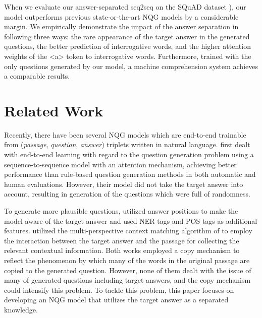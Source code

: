 \documentclass[letterpaper]{article} %
\newcommand{\kj}[1]{\textcolor{red}{#1}}
\begin{document}
When we evaluate our answer-separated seq2seq on the SQuAD dataset \cite{rajpurkar2016squad}), our model outperforms previous state-or-the-art NQG models by a considerable margin. We empirically demonstrate the impact of the answer separation in following three ways: the rare appearance of the target answer in the generated questions, the better prediction of interrogative words, and the higher attention weights of the \textless a\textgreater{} token to interrogative words. Furthermore, trained with the only questions generated by our model, a machine comprehension system achieves a comparable results.
%
%
%
%



\section{Related Work}
Recently, there have been several NQG models which are end-to-end trainable from (\textit{passage}, \textit{question}, \textit{answer}) triplets written in natural language.
\cite{du2017learning} first dealt with end-to-end learning with regard to the question generation problem using a sequence-to-sequence model with an attention mechanism, achieving better performance than rule-based question generation methods in both automatic and human evaluations.
However, their model did not take the target answer into account, resulting in generation of the questions which were full of randomness.

To generate more plausible questions, \cite{zhou2017neural} utilized answer positions to make the model aware of the target answer and used NER tags and POS tags as additional features.
\cite{song2018leveraging} utilized the multi-perspective context matching algorithm of \cite{wang2017bilateral} to employ the interaction between the target answer and the passage for collecting the relevant contextual information.
Both works employed a copy mechanism \cite{gulcehre2016pointing} to reflect the phenomenon by which many of the words in the original passage are copied to the generated question.
However, none of them dealt with the issue of many of generated questions including target answers, and the copy mechanism could intensify this problem.
To tackle this problem, this paper focuses on developing an NQG model that utilizes the target answer as a separated knowledge.
\end{document}
